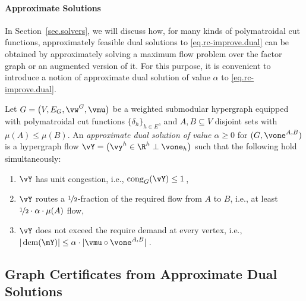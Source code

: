 \documentclass[letterpaper]{article}
\newcommand{\dem}{\operatorname{dem}}
\renewcommand{\cong}{\operatorname{cong}}
\begin{document}
\paragraph{Approximate Solutions}
In Section~\ref{sec.solvers}, we will discuss how, for many kinds of polymatroidal cut functions, approximately feasible dual solutions to \eqref{eq.rc-improve.dual} can be obtained by approximately solving a maximum flow problem over the factor graph or an augmented version of it.
For this purpose, it is convenient to introduce a notion of approximate dual solution of value $\alpha$ to \eqref{eq.rc-improve.dual}.

\begin{definition}
\label{def.approximate-primal-dual-solution}
Let $G = \big( V, E_G, \vw^G, \vmu \big)$ be a weighted submodular hypergraph equipped with polymatroidal cut functions $\{\delta_h\}_{h\in E}$, and $A,B \subseteq V$ disjoint sets with $\mu(A) \leq \mu(B)$. An \emph{approximate dual solution of value $\alpha \geq 0$} for $(G,\vone^{A,B})$ is a hypergraph flow $\vY = \big(\vy^h \in \R^h \perp \vone_h\big)$
such that the following hold simultaneously:
\begin{enumerate}
\item $\vY$ has unit congestion, i.e., $\cong_G(\vY) \leq 1$\,,
\item $\vY$ routes a $\nicefrac{1}{2}$-fraction of the required flow from $A$ to $B$, i.e., at least $\nicefrac{1}{2} \cdot \alpha \cdot \mu(A) $  flow,
\item $\vY$ does not exceed the require demand at every vertex, i.e., $|\dem (\mY)| \leq \alpha \cdot |\vmu \circ \vone^{A,B}|$\,.
\end{enumerate}
\end{definition}


\subsection{Graph Certificates from Approximate Dual Solutions}
\end{document}
